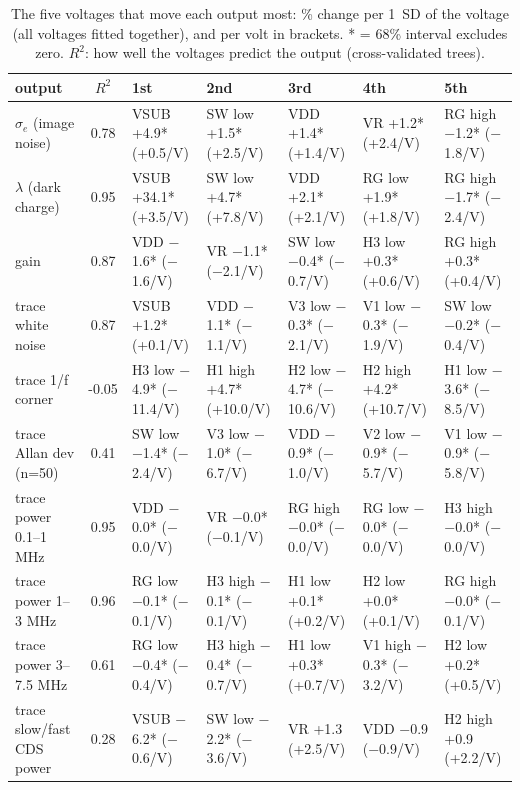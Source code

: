 \begin{table}[H]\centering\scriptsize
\caption{The five voltages that move each output most: \% change per 1~SD of the voltage (all voltages fitted together), and per volt in brackets. * = 68\% interval excludes zero. $R^2$: how well the voltages predict the output (cross-validated trees).}\label{tab:effects}
\begin{tabular}{p{2.6cm}cp{2.1cm}p{2.1cm}p{2.1cm}p{2.1cm}p{2.1cm}}\toprule
output & $R^2$ & 1st & 2nd & 3rd & 4th & 5th\\\midrule
$\sigma_e$ (image noise) & 0.78 & VSUB +4.9* (+0.5/V) & SW low +1.5* (+2.5/V) & VDD +1.4* (+1.4/V) & VR +1.2* (+2.4/V) & RG high $-$1.2* ($-$1.8/V)\\
$\lambda$ (dark charge) & 0.95 & VSUB +34.1* (+3.5/V) & SW low +4.7* (+7.8/V) & VDD +2.1* (+2.1/V) & RG low +1.9* (+1.8/V) & RG high $-$1.7* ($-$2.4/V)\\
gain & 0.87 & VDD $-$1.6* ($-$1.6/V) & VR $-$1.1* ($-$2.1/V) & SW low $-$0.4* ($-$0.7/V) & H3 low +0.3* (+0.6/V) & RG high +0.3* (+0.4/V)\\
trace white noise & 0.87 & VSUB +1.2* (+0.1/V) & VDD $-$1.1* ($-$1.1/V) & V3 low $-$0.3* ($-$2.1/V) & V1 low $-$0.3* ($-$1.9/V) & SW low $-$0.2* ($-$0.4/V)\\
trace 1/f corner & -0.05 & H3 low $-$4.9* ($-$11.4/V) & H1 high +4.7* (+10.0/V) & H2 low $-$4.7* ($-$10.6/V) & H2 high +4.2* (+10.7/V) & H1 low $-$3.6* ($-$8.5/V)\\
trace Allan dev (n=50) & 0.41 & SW low $-$1.4* ($-$2.4/V) & V3 low $-$1.0* ($-$6.7/V) & VDD $-$0.9* ($-$1.0/V) & V2 low $-$0.9* ($-$5.7/V) & V1 low $-$0.9* ($-$5.8/V)\\
trace power 0.1--1 MHz & 0.95 & VDD $-$0.0* ($-$0.0/V) & VR $-$0.0* ($-$0.1/V) & RG high $-$0.0* ($-$0.0/V) & RG low $-$0.0* ($-$0.0/V) & H3 high $-$0.0* ($-$0.0/V)\\
trace power 1--3 MHz & 0.96 & RG low $-$0.1* ($-$0.1/V) & H3 high $-$0.1* ($-$0.1/V) & H1 low +0.1* (+0.2/V) & H2 low +0.0* (+0.1/V) & RG high $-$0.0* ($-$0.1/V)\\
trace power 3--7.5 MHz & 0.61 & RG low $-$0.4* ($-$0.4/V) & H3 high $-$0.4* ($-$0.7/V) & H1 low +0.3* (+0.7/V) & V1 high $-$0.3* ($-$3.2/V) & H2 low +0.2* (+0.5/V)\\
trace slow/fast CDS power & 0.28 & VSUB $-$6.2* ($-$0.6/V) & SW low $-$2.2* ($-$3.6/V) & VR +1.3 (+2.5/V) & VDD $-$0.9 ($-$0.9/V) & H2 high +0.9 (+2.2/V)\\
\bottomrule\end{tabular}\end{table}

